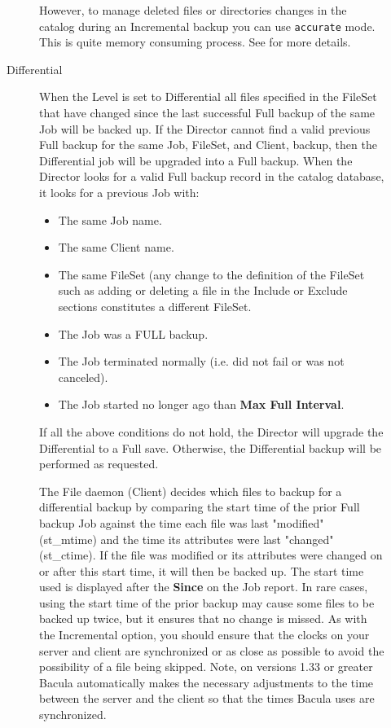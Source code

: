 \begin{description}
\begin{description}
   However, to manage deleted files or directories changes in the
   catalog during an Incremental backup you can use \texttt{accurate}
   mode. This is quite memory consuming process. See  for more details.

\item [Differential]
   When the Level is set to Differential
   all files specified in the FileSet that have changed since the last
   successful Full backup of the same Job will be backed up.
   If the Director cannot find a
   valid previous Full backup for the same Job, FileSet, and Client,
   backup, then the Differential job will be upgraded into a Full backup.
   When the Director looks for a valid Full backup record in the catalog
   database, it looks for a previous Job with:

\begin{itemize}
\item The same Job name.  
\item The same Client name.  
\item The same FileSet (any change to the definition of  the FileSet such as
   adding or deleting a file in the  Include or Exclude sections constitutes a
   different FileSet.  
\item The Job was a FULL backup.  
\item The Job terminated normally (i.e. did not fail or was not  canceled).  
\item The Job started no longer ago than {\bf Max Full Interval}.
\end{itemize}

   If all the above conditions do not hold, the Director will  upgrade the
   Differential to a Full save. Otherwise, the  Differential backup will be
   performed as requested.  

   The File daemon (Client) decides which files to backup for a
   differential backup by comparing the start time of the prior Full backup
   Job against the time each file was last "modified" (st\_mtime) and the
   time its attributes were last "changed" (st\_ctime).  If the file was
   modified or its attributes were changed on or after this start time, it
   will then be backed up.  The start time used is displayed after the {\bf
   Since} on the Job report.  In rare cases, using the start time of the
   prior backup may cause some files to be backed up twice, but it ensures
   that no change is missed.  As with the Incremental option, you should
   ensure that the clocks on your server and client are synchronized or as
   close as possible to avoid the possibility of a file being skipped.
   Note, on versions 1.33 or greater Bacula automatically makes the
   necessary adjustments to the time between the server and the client so
   that the times Bacula uses are synchronized.


\end{description}
\end{description}
